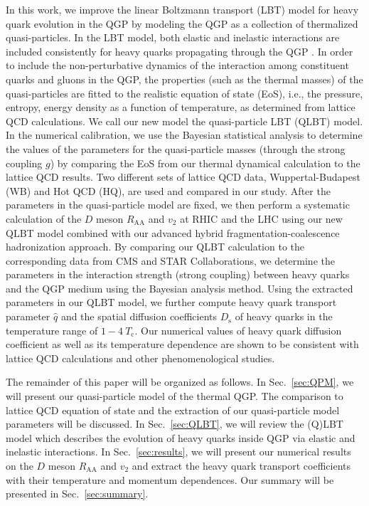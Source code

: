 \documentclass[aps,superscriptaddress,prc,twocolumn,nofootinbib]{revtex4}
\begin{document}
In this work, we improve the linear Boltzmann transport (LBT) model for heavy quark evolution in the QGP by modeling the QGP as a collection of thermalized quasi-particles.
In the LBT model, both elastic and inelastic interactions are included consistently for heavy quarks propagating through the QGP \cite{Wang:2013cia, He:2015pra, Cao:2016gvr, Cao:2017hhk, Xing:2019xae}.
In order to include the non-perturbative dynamics of the interaction among constituent quarks and gluons in the QGP, the properties (such as the thermal masses) of the quasi-particles are fitted to the realistic equation of state (EoS), i.e., the pressure, entropy, energy density as a function of temperature, as determined from lattice QCD calculations.
We call our new model the quasi-particle LBT (QLBT) model.
In the numerical calibration, we use the Bayesian statistical analysis to determine the values of the parameters for the quasi-particle masses (through the strong coupling $g$) by comparing the EoS from our thermal dynamical calculation to the lattice QCD results.
Two different sets of lattice QCD data, Wuppertal-Budapest (WB) and Hot QCD (HQ), are used and compared in our study.
After the parameters in the quasi-particle model are fixed, we then perform a systematic calculation of the $D$ meson $R_\mathrm{AA}$ and $v_2$ at RHIC and the LHC using our new QLBT model combined with our advanced hybrid fragmentation-coalescence hadronization approach.
By comparing our QLBT calculation to the corresponding data from CMS and STAR Collaborations, we determine the parameters in the interaction strength (strong coupling) between heavy quarks and the QGP medium using the Bayesian analysis method.
Using the  extracted parameters in our QLBT model, we further compute heavy quark transport parameter $\hat{q}$ and the spatial diffusion coefficients $D_\mathrm{s}$ of heavy quarks in the temperature range of $1-4~T_\mathrm{c}$.
Our numerical values of heavy quark diffusion coefficient as well as its temperature dependence are shown to be consistent with lattice QCD calculations and other phenomenological studies.

The remainder of this paper will be organized as follows. In Sec.~\ref{sec:QPM}, we will present our quasi-particle model of the thermal QGP. The comparison to lattice QCD equation of state and the extraction of our quasi-particle model parameters will be discussed. In Sec.~\ref{sec:QLBT}, we will review the (Q)LBT model which describes the evolution of heavy quarks inside QGP via elastic and inelastic interactions. In Sec.~\ref{sec:results}, we will present our numerical results on the $D$ meson $R_\mathrm{AA}$ and $v_2$ and extract the heavy quark transport coefficients with their temperature and momentum dependences. Our summary will be presented in Sec.~\ref{sec:summary}.
\end{document}

